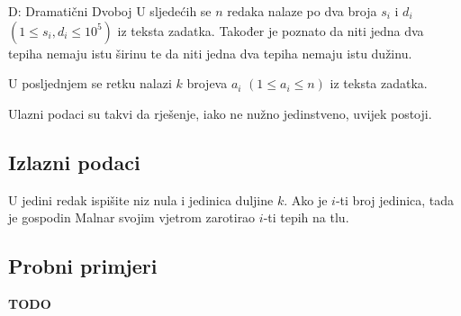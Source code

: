 \begin{statement}[
  timelimit=1 s,
  memorylimit=512 MiB,
]{D: Dramatični Dvoboj}
U sljedećih se $n$ redaka nalaze po dva broja $s_i$ i $d_i$
$(1 \le s_i, d_i \le 10^5)$ iz teksta zadatka. Također je poznato
da niti jedna dva tepiha nemaju istu širinu te da niti jedna dva tepiha
nemaju istu dužinu.

U posljednjem se retku nalazi $k$ brojeva $a_i$ $(1 \le a_i \le n)$ iz
teksta zadatka.

Ulazni podaci su takvi da rješenje, iako ne nužno jedinstveno, uvijek
postoji.

\subsection*{Izlazni podaci}
U jedini redak ispišite niz nula i jedinica duljine $k$. Ako je $i$-ti broj
jedinica, tada je gospodin Malnar svojim vjetrom zarotirao $i$-ti tepih na
tlu.

\subsection*{Probni primjeri}

\textbf{TODO}

\end{statement}

